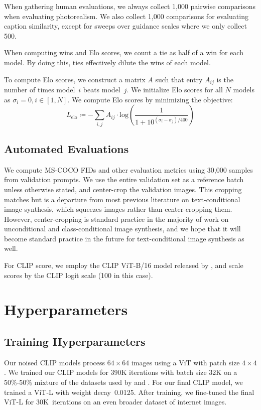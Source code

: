 \documentclass{article}
\begin{document}
When gathering human evaluations, we always collect 1,000 pairwise comparisons when evaluating photorealism. We also collect 1,000 comparisons for evaluating caption similarity, except for sweeps over guidance scales where we only collect 500.

When computing wins and Elo scores, we count a tie as half of a win for each model. By doing this, ties effectively dilute the wins of each model.

To compute Elo scores, we construct a matrix $A$ such that entry $A_{ij}$ is the number of times model~$i$ beats model~$j$. We initialize Elo scores for all $N$ models as $\sigma_i = 0, i \in [1,N]$. We compute Elo scores by minimizing the objective:
%
$$L_{\textrm{elo}} \coloneqq - \sum_{i,j} A_{ij} \cdot \textrm{log}\left(\frac{1}{1+10^{(\sigma_i - \sigma_j)/400}}\right)$$

\subsection{Automated Evaluations}

We compute MS-COCO FIDs and other evaluation metrics using 30,000 samples from validation prompts. We use the entire validation set as a reference batch unless otherwise stated, and center-crop the validation images. This cropping matches \citet{dalle} but is a departure from most previous literature on text-conditional image synthesis, which squeezes images rather than center-cropping them. However, center-cropping is standard practice in the majority of work on unconditional and class-conditional image synthesis, and we hope that it will become standard practice in the future for text-conditional image synthesis as well.

For CLIP score, we employ the CLIP ViT-B/16 model released by \citet{clip}, and scale scores by the CLIP logit scale (100 in this case).

\section{Hyperparameters}

\subsection{Training Hyperparameters}

Our noised CLIP models process $64 \times 64$ images using a ViT \citep{vit} with patch size $4 \times 4$. We trained our CLIP models for 390K iterations with batch size 32K on a 50\%-50\% mixture of the datasets used by \citet{clip} and \citet{dalle}. For our final CLIP model, we trained a ViT-L with weight decay~0.0125. After training, we fine-tuned the final ViT-L for 30K~iterations on an even broader dataset of internet images.
\end{document}
